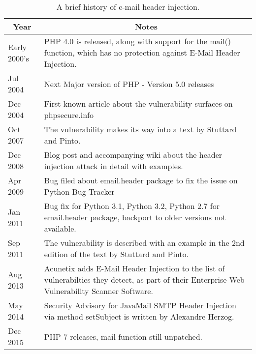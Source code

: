 \begin{table}[!htbp]
	\centering
	\begin{tabular}{|p{2cm}|p{12cm}|}
		\hline
		\multicolumn{1}{|c|}{\textbf{Year}} & \multicolumn{1}{c|}{\textbf{ Notes}}\\
		\hline

		{Early 2000's } & { PHP 4.0 is released, along with support for the mail() function, which has no protection against E-Mail Header Injection.}\\
		\hline

		{Jul 2004} & { Next Major version of PHP - Version 5.0 releases}\\
		\hline

		{Dec 2004} & { First known article about the vulnerability surfaces on phpsecure.info}\\
		\hline

		{Oct 2007} & {The vulnerability makes its way into a text by Stuttard and Pinto. }\\
		\hline

		{Dec 2008} & {Blog post and accompanying wiki about the header injection attack in detail with examples.}\\
		\hline

		{Apr 2009} & {Bug filed about email.header package to fix the issue on Python Bug Tracker}\\
		\hline

		{Jan 2011} & {Bug fix for Python 3.1, Python 3.2, Python 2.7 for email.header package, backport to older versions not available.}\\
		\hline

		{Sep 2011} & {The vulnerability is described with an example in the 2nd edition of the text by Stuttard and Pinto.}\\
		\hline

		{Aug 2013} & {Acunetix adds E-Mail Header Injection to the list of vulnerabilties they detect, as part of their Enterprise Web Vulnerability Scanner Software.}\\
		\hline

		{May 2014} & {Security Advisory for JavaMail SMTP Header Injection via method setSubject is written by Alexandre Herzog.}\\
		\hline

		{Dec 2015}  & {PHP 7 releases, mail function still unpatched.}\\
		\hline
	\end{tabular}
	\caption[]{A brief history of e-mail header injection.}
	\label{tab:history}
\end{table}
